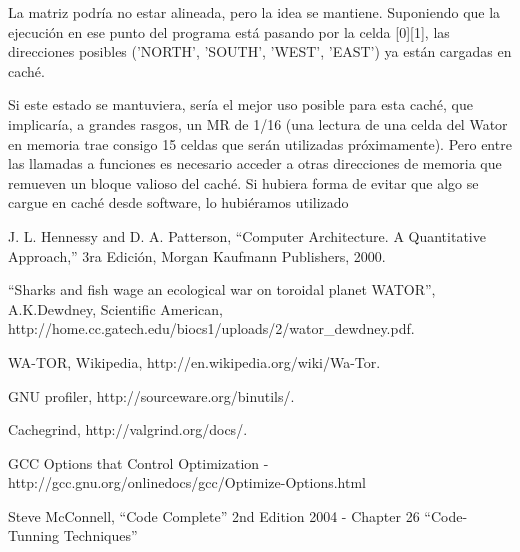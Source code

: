\documentclass[a4paper,10pt]{article}
\begin{document}
La matriz podr\'ia no estar alineada, pero la idea se mantiene. Suponiendo que la ejecuci\'on en ese punto del programa est\'a pasando por la celda [0][1], las direcciones posibles ('NORTH', 'SOUTH', 'WEST', 'EAST') ya est\'an cargadas en cach\'e.

Si este estado se mantuviera, ser\'ia el mejor uso posible para esta cach\'e, que implicar\'ia, a grandes rasgos, un MR de 1/16 (una lectura de una celda del Wator en memoria trae consigo 15 celdas que ser\'an utilizadas pr\'oximamente). Pero entre las llamadas a funciones es necesario acceder a otras direcciones de memoria que remueven un bloque valioso del cach\'e. Si hubiera forma de evitar que algo se cargue en cach\'e desde software, lo hubi\'eramos utilizado
    
\begin{thebibliography}{99}

 J. L. Hennessy and D. A. Patterson, ``Computer Architecture. A Quantitative
Approach,'' 3ra Edici\'on, Morgan Kaufmann Publishers, 2000.

 ``Sharks and fish wage an ecological war on toroidal planet WATOR'', A.K.Dewdney, Scientific American,\\
http://home.cc.gatech.edu/biocs1/uploads/2/wator\_dewdney.pdf.

 WA-TOR, Wikipedia, http://en.wikipedia.org/wiki/Wa-Tor.

 GNU profiler, http://sourceware.org/binutils/.

 Cachegrind, http://valgrind.org/docs/.

 GCC Options that Control Optimization - http://gcc.gnu.org/onlinedocs/gcc/Optimize-Options.html

 Steve McConnell, ``Code Complete'' 2nd Edition 2004 - Chapter 26 ``Code-Tunning Techniques''

\end{thebibliography}
\end{document}
